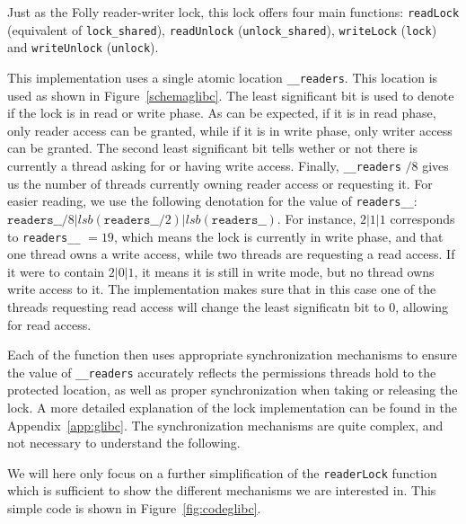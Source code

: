 Just as the Folly reader-writer lock, this lock offers four main functions: \texttt{readLock} (equivalent of \texttt{lock\_shared}), \texttt{readUnlock} (\texttt{unlock\_shared}), \texttt{writeLock} (\texttt{lock}) and \texttt{writeUnlock} (\texttt{unlock}).

This implementation uses a single atomic location \texttt{\_\_readers}. This location is used as shown in Figure~\ref{schemaglibc}. The least significant bit is used to denote if the lock is in read or write phase. As can be expected, if it is in read phase, only reader access can be granted, while if it is in write phase, only writer access can be granted. The second least significant bit tells wether or not there is currently a thread asking for or having write access. Finally, \texttt{\_\_readers} $/ 8$ gives us the number of threads currently owning reader access or requesting it. For easier reading, we use the following denotation for the value of \texttt{readers\_\_}: $\mathtt{readers\_\_} / 8 | lsb(\mathtt{readers\_\_ }/ 2) | lsb(\mathtt{readers\_\_})$. For instance, $2|1|1$ corresponds to \texttt{readers\_\_} $=19$, which means the lock is currently in write phase, and that one thread owns a write access, while two threads are requesting a read access. If it were to contain $2 | 0 | 1$, it means it is still in write mode, but no thread owns write access to it. The implementation makes sure that in this case one of the threads requesting read access will change the least significatn bit to $0$, allowing for read access.

Each of the function then uses appropriate synchronization mechanisms to ensure the value of \texttt{\_\_readers} accurately reflects the permissions threads hold to the protected location, as well as proper synchronization when taking or releasing the lock. A more detailed explanation of the lock implementation can be found in the Appendix~\ref{app:glibc}. The synchronization mechanisms are quite complex, and not necessary to understand the following.

We will here only focus on a further simplification of the \texttt{readerLock} function which is sufficient to show the different mechanisms we are interested in. 
This simple code is shown in Figure~\ref{fig:codeglibc}.

